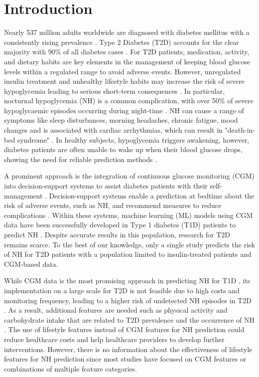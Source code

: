 \section{Introduction}
\label{introduction}

Nearly 537 million adults worldwide are diagnosed with diabetes mellitus with a consistently rising prevalence \cite{federation2021idf}. Type 2 Diabetes (T2D) accounts for the clear majority with 90\% of all diabetes cases \cite{federation2021idf}. For T2D patients, medication, activity, and dietary habits are key elements in the management of keeping blood glucose levels within a regulated range to avoid adverse events. However, unregulated insulin treatment and unhealthy lifestyle habits may increase the risk of severe hypoglycemia leading to serious short-term consequences \cite{evans2013health}. In particular, nocturnal hypoglycemia (NH) is a common complication, with over 50\% of severe hypoglycaemic episodes occurring during night-time \cite{graveling2017risks}. NH can cause a range of symptoms like sleep disturbances, morning headaches, chronic fatigue, mood changes and is associated with cardiac arrhythmias, which can result in "death-in-bed syndrome" \cite{graveling2017risks}. In healthy subjects, hypoglycemia triggers awakening, however, diabetes patients are often unable to wake up when their blood glucose drops, showing the need for reliable prediction methods \cite{schultes2007defective}. 

A prominent approach is the integration of continuous glucose monitoring (CGM) into decision-support systems to assist diabetes patients with their self-management \cite{vettoretti2018continuous}. Decision-support systems enable a prediction at bedtime about the risk of adverse events, such as NH, and recommend measures to reduce complications \cite{cappon2017wearable}. Within these systems, machine learning (ML) models using CGM data have been successfully developed in Type 1 diabetes (T1D) patients to predict NH \cite{bertachi2020prediction,parcerisas2022machine,berikov2022machine,guemes2019predicting}. Despite accurate results in this population, research for T2D remains scarce. To the best of our knowledge, only a single study \cite{kronborg2022bedtime} predicts the risk of NH for T2D patients with a population limited to insulin-treated patients and CGM-based data. 

While CGM data is the most promising approach in predicting NH for T1D \cite{mujahid2021machine,felizardo2021data,zhang2023data}, its implementation on a large scale for T2D is not feasible due to high costs and monitoring frequency, leading to a higher risk of undetected NH episodes in T2D \cite{oyaguez2021cost,wood2018continuous}. As a result, additional features are needed such as physical activity and carbohydrate intake that are related to T2D prevalence and the occurrence of NH \cite{woodward2009nocturnal,wilson2015factors}. The use of lifestyle features instead of CGM features for NH prediction could reduce healthcare costs and help healthcare providers to develop further interventions. However, there is no information about the effectiveness of lifestyle features for NH prediction since most studies have focused on CGM features or combinations of multiple feature categories.

